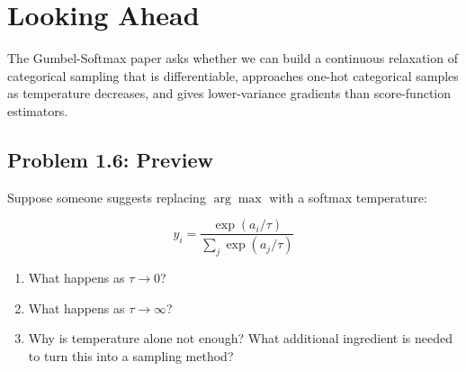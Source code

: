 \documentclass[11pt]{article}
\begin{document}
\section{Looking Ahead}

\begin{keyidea}
The Gumbel-Softmax paper asks whether we can build a continuous relaxation of categorical sampling that is differentiable, approaches one-hot categorical samples as temperature decreases, and gives lower-variance gradients than score-function estimators.
\end{keyidea}

\subsection*{Problem 1.6: Preview}

Suppose someone suggests replacing $\arg\max$ with a softmax temperature:

\[
y_i = \frac{\exp(a_i / \tau)}{\sum_j \exp(a_j / \tau)}
\]

\begin{enumerate}[label=(\alph*)]
    \item What happens as $\tau \to 0$?
    \item What happens as $\tau \to \infty$?
    \item Why is temperature alone not enough? What additional ingredient is needed to turn this into a sampling method?
\end{enumerate}
\end{document}
